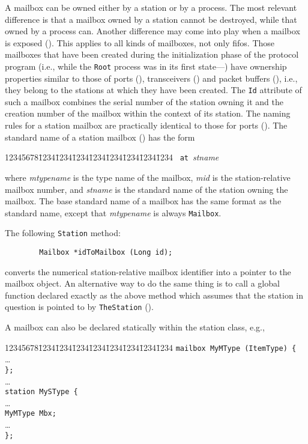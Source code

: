 A mailbox can be owned either by a station or by a process.
The most relevant difference is that a mailbox owned by a station cannot be
destroyed, while that owned by a process can.
Another difference may come into play when a mailbox is exposed ().
This applies to all kinds of mailboxes, not only fifos.
Those mailboxes that have been created during the initialization phase
of the protocol program (i.e., while the {\tt Root} process was in its first
state---) have ownership properties similar to those of ports
(), transceivers ()
and packet buffers (), i.e., they
belong to the stations at which they have been created.
The {\tt Id} attribute of such a mailbox combines the serial number
of the station owning it and the creation number of the mailbox within the
context of its station.
The naming rules for a station mailbox are practically identical to those
for ports ().
The standard name of a station mailbox () has the form
{\tt\begin{tabbing}
12345678\=1234\=1234\=1234\=1234\=1234\=1234\=1234\=1234\kill
{}~{\tt at}~{\em stname}
\end{tabbing}}
where {\em mtypename\/} is the type name of the mailbox,
{\em mid\/} is the station-relative mailbox number,
and {\em stname\/} is the standard name of the station owning the mailbox.
The base standard name of a mailbox has the same format as the standard name,
except that {\em mtypename\/} is always {\tt Mailbox}.

The following {\tt Station} method:
\begin{verbatim}
        Mailbox *idToMailbox (Long id);
\end{verbatim}
converts the numerical station-relative mailbox identifier into
a pointer to the mailbox object.
An alternative way to do the same thing is to call a global function declared
exactly as the above method which assumes that the station in question is
pointed to by {\tt TheStation} ().

A mailbox can also be declared statically within the station class, e.g.,
{\tt\begin{tabbing}
12345678\=1234\=1234\=1234\=1234\=1234\=1234\=1234\=1234\kill
\> {\tt mailbox MyMType (ItemType) \{} \\
\> \> \ldots \\
\> {\tt \};} \\
\> \ldots \\
\> {\tt station MySType \{} \\
\> \> \ldots \\
\> \> {\tt MyMType Mbx; } \\
\> \> \ldots \\
\> {\tt \};}
\end{tabbing}}

